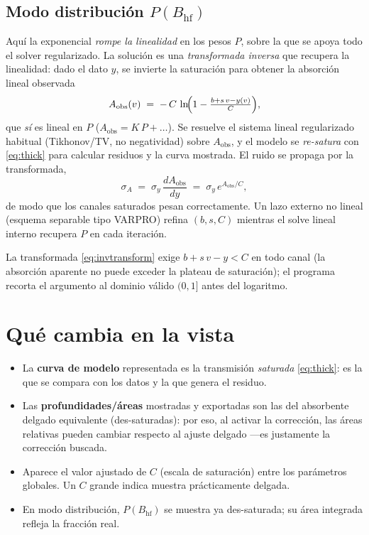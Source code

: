 \documentclass[11pt,a4paper]{article}
\newcommand{\BHF}{B_{\mathrm{hf}}}
\begin{document}
\subsection{Modo distribución \texorpdfstring{$P(\BHF)$}{P(BHF)}}
Aquí la exponencial \emph{rompe la linealidad} en los pesos $P$, sobre la que se
apoya todo el solver regularizado. La solución es una \emph{transformada inversa}
que recupera la linealidad: dado el dato $y$, se invierte la saturación para
obtener la absorción lineal observada
\begin{equation}
  A_{\text{obs}}(v) \;=\; -\,C\,\ln\!\Bigl(1 - \tfrac{b + s\,v - y(v)}{C}\Bigr),
  \label{eq:invtransform}
\end{equation}
que \emph{sí} es lineal en $P$ ($A_{\text{obs}}=K\,P+\dots$). Se resuelve el
sistema lineal regularizado habitual (Tikhonov/TV, no negatividad) sobre
$A_{\text{obs}}$, y el modelo se \emph{re-satura} con \eqref{eq:thick} para
calcular residuos y la curva mostrada. El ruido se propaga por la transformada,
\begin{equation}
  \sigma_{A} \;=\; \sigma_y\,\frac{dA_{\text{obs}}}{dy} \;=\; \sigma_y\,e^{A_{\text{obs}}/C},
\end{equation}
de modo que los canales saturados pesan correctamente. Un lazo externo no lineal
(esquema separable tipo VARPRO) refina $(b,s,C)$ mientras el solve lineal interno
recupera $P$ en cada iteración.

\begin{nota}
La transformada \eqref{eq:invtransform} exige $b+s\,v-y < C$ en todo canal (la
absorción aparente no puede exceder la plateau de saturación); el programa recorta
el argumento al dominio válido $(0,1]$ antes del logaritmo.
\end{nota}

\section{Qué cambia en la vista}

\begin{itemize}[leftmargin=*]
  \item La \textbf{curva de modelo} representada es la transmisión \emph{saturada}
        \eqref{eq:thick}: es la que se compara con los datos y la que genera el
        residuo.
  \item Las \textbf{profundidades/áreas} mostradas y exportadas son las del
        absorbente delgado equivalente (des-saturadas): por eso, al activar la
        corrección, las áreas relativas pueden cambiar respecto al ajuste delgado
        —es justamente la corrección buscada.
  \item Aparece el valor ajustado de $C$ (escala de saturación) entre los
        parámetros globales. Un $C$ grande indica muestra prácticamente delgada.
  \item En modo distribución, $P(\BHF)$ se muestra ya des-saturada; su área
        integrada refleja la fracción real.
\end{itemize}
\end{document}
